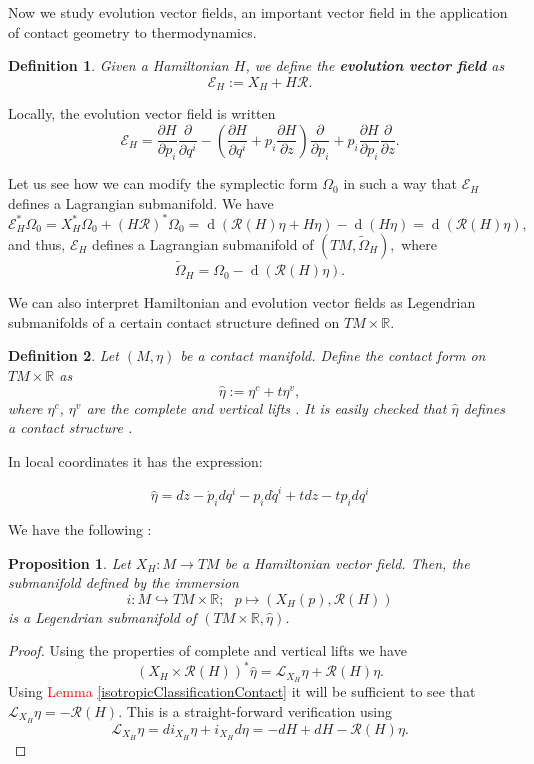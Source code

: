 \documentclass[12pt]{article}
\newtheorem{prop}{Proposition}[section]
\newtheorem{Def}{Definition}[section]
\renewcommand{\d}{\operatorname{d}}
\newcommand{\partder}[2]{\frac{\partial #1}{\partial #2}}
\begin{document}
Now we study evolution vector fields, an important vector field in the application of contact geometry to thermodynamics.\\

\begin{Def} Given a Hamiltonian $H$, we define the \textbf{evolution vector field} as $$\mathcal{E}_H := X_H + H \mathcal{R}.$$
\end{Def}

Locally, the evolution vector field is written $$\mathcal{E}_H = \partder{H}{p_i} \partder{}{q^i} - \left (\partder{H}{q^i} + p_i\partder{H}{z} \right) \partder{}{p_i} + p_i \partder{H}{p_i}\partder{}{z}.$$

Let us see how we can modify the symplectic form $\Omega_0$ in such a way that $\mathcal{E}_H$ defines a Lagrangian submanifold. We have $$\mathcal{E}_H^*\Omega_0 = X_H^* \Omega_0 + (H \mathcal{R}) ^* \Omega_0 = \d(\mathcal{R}(H) \eta + H\eta) - \d(H \eta) = \d( \mathcal{R}(H) \eta),$$ and thus, $\mathcal{E}_H$ defines a Lagrangian submanifold of $(TM , \widetilde \Omega_H),$ where $$\widetilde \Omega_H = \Omega_0 - \d(\mathcal{R}(H) \eta).$$

We can also interpret Hamiltonian and evolution vector fields as Legendrian submanifolds of a certain contact structure defined on $TM \times \mathbb{R}.$\\
 
\begin{Def} Let $(M, \eta)$ be a contact manifold. Define the contact form on $TM \times \mathbb{R}$ as $$\hat{\eta} := \eta^c + t \eta^v,$$  where $\eta^c$, $\eta^v$ are the complete and vertical lifts \cites{de2011methods}. It is easily checked that $\hat{\eta}$ defines a contact structure \cites{de2019contact}. 
\end{Def}
In local coordinates it has the expression: 

$$\hat{\eta} = d\dot{z} - \dot{p}_i dq^i - p_i d\dot{q}^i + t dz - tp_i dq^i$$

We have the following \cites{de2019contact}:\\
\begin{prop} Let $X_H: M \rightarrow TM$ be a Hamiltonian vector field. Then, the submanifold defined by the immersion $$i: M \hookrightarrow TM \times \mathbb{R};\,\,\,\,p \mapsto (X_H(p), \mathcal{R}(H))$$ is a Legendrian submanifold of $(TM\times \mathbb{R}, \hat{\eta})$.
\end{prop}
\begin{proof} Using the properties of complete and vertical lifts we have $$(X_H \times \mathcal{R}(H)) ^* \hat{\eta} = \mathcal{L}_{X_H}\eta + \mathcal{R}(H) \eta.$$ Using \textcolor{red}{Lemma \ref{isotropicClassificationContact}} it will be sufficient to see that $\mathcal{L}_{X_H} \eta = - \mathcal{R}(H).$ This is a straight-forward verification using $$\mathcal{L}_{X_H} \eta = di_{X_H} \eta + i_{X_H} d\eta = - dH + dH - \mathcal{R}(H) \eta. $$
\end{proof}
\end{document}
